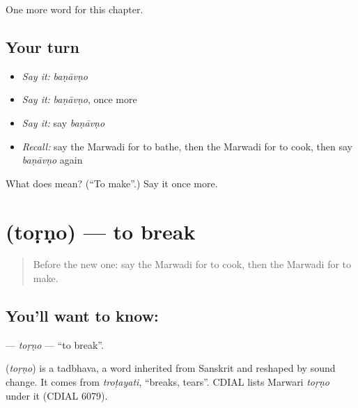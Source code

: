\begin{grammarlens}[title={What you've built}]
One more word for this chapter.
\end{grammarlens}

\subsection*{Your turn}
\begin{itemize}
\raggedright
  \item \emph{Say it:} \emph{baṇāvṇo}
  \item \emph{Say it:} \emph{baṇāvṇo}, once more
  \item \emph{Say it:} say \emph{baṇāvṇo}
  \item \emph{Recall:} say the Marwadi for to bathe, then the Marwadi for to cook, then say \emph{baṇāvṇo} again
\end{itemize}

\begin{tcolorbox}[breakable,colback=teal!4,colframe=teal!35!black,title={Before you move on}]
What does  mean? (\textquotedblleft{}To make\textquotedblright{}.) Say it once more.
\end{tcolorbox}
\section[\texorpdfstring{\mw{तोड़णो} (toṛṇo)}{तोड़णो (toṛṇo)}]{ (toṛṇo) — to break}

\label{lesson:MW-C103-torno}



\begin{quote}
Before the new one: say the Marwadi for to cook, then the Marwadi for to make.
\end{quote}

\subsection*{You'll want to know: }
\textbf{} — \emph{toṛṇo} — \textquotedblleft{}to break\textquotedblright{}.

\begin{cousinweb}
\textbf{} (\emph{toṛṇo}) is a tadbhava, a word inherited from Sanskrit and reshaped by sound change. It comes from \emph{troṭayati}, \textquotedblleft{}breaks, tears\textquotedblright{}. CDIAL lists Marwari \emph{toṛṇo} under it (CDIAL 6079).
\end{cousinweb}

